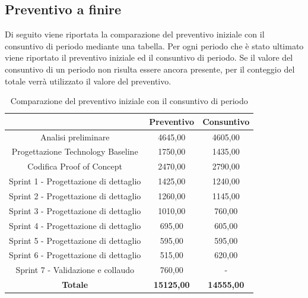 \subsection{Preventivo a finire} \label{subsection:preventivo_a_finire}
Di seguito viene riportata la comparazione del preventivo iniziale con il consuntivo di periodo mediante una tabella.
Per ogni periodo che è stato ultimato viene riportato il preventivo iniziale ed il consuntivo di periodo.
Se il valore del consuntivo di un periodo non risulta essere ancora presente, per il conteggio del totale verrà utilizzato il valore del preventivo.
\begin{table}[H]
  \centering
  \renewcommand{\arraystretch}{1.8}
  \begin{tabular}{c|c|c}
    \rowcolor[HTML]{125E28}
    \multicolumn{1}{c}{\color[HTML]{FFFFFF}\textbf{Periodo}}
                                          & \multicolumn{1}{c}{\color[HTML]{FFFFFF}\textbf{Preventivo}}
                                          & \multicolumn{1}{c}{\color[HTML]{FFFFFF}\textbf{Consuntivo}}                     \\
    \hline
    Analisi preliminare                   & 4645,00                                                     & 4605,00           \\
    Progettazione Technology Baseline     & 1750,00                                                     & 1435,00           \\
    Codifica Proof of Concept             & 2470,00                                                     & 2790,00           \\
    Sprint 1 - Progettazione di dettaglio & 1425,00                                                     & 1240,00           \\
    Sprint 2 - Progettazione di dettaglio & 1260,00                                                     & 1145,00           \\
    Sprint 3 - Progettazione di dettaglio & 1010,00                                                     & 760,00            \\
    Sprint 4 - Progettazione di dettaglio & 695,00                                                      & 605,00            \\
    Sprint 5 - Progettazione di dettaglio & 595,00                                                      & 595,00            \\
    Sprint 6 - Progettazione di dettaglio & 515,00                                                      & 620,00            \\
    Sprint 7 - Validazione e collaudo     & 760,00                                                      & -                 \\
    \textbf{Totale}                       & \textbf{15125,00}                                           & \textbf{14555,00} \\
  \end{tabular}
  \caption{Comparazione del preventivo iniziale con il consuntivo di periodo}
\end{table}

